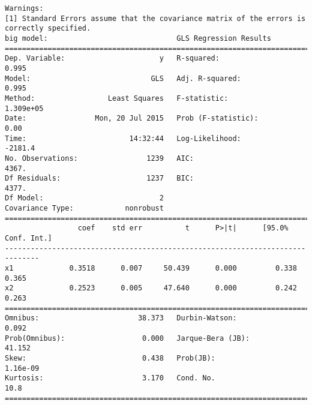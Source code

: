 \documentclass{article}
\begin{document}
\begin{verbatim}
Warnings:
[1] Standard Errors assume that the covariance matrix of the errors is correctly specified.
big model:                              GLS Regression Results                            
==============================================================================
Dep. Variable:                      y   R-squared:                       0.995
Model:                            GLS   Adj. R-squared:                  0.995
Method:                 Least Squares   F-statistic:                 1.309e+05
Date:                Mon, 20 Jul 2015   Prob (F-statistic):               0.00
Time:                        14:32:44   Log-Likelihood:                -2181.4
No. Observations:                1239   AIC:                             4367.
Df Residuals:                    1237   BIC:                             4377.
Df Model:                           2                                         
Covariance Type:            nonrobust                                         
==============================================================================
                 coef    std err          t      P>|t|      [95.0% Conf. Int.]
------------------------------------------------------------------------------
x1             0.3518      0.007     50.439      0.000         0.338     0.365
x2             0.2523      0.005     47.640      0.000         0.242     0.263
==============================================================================
Omnibus:                       38.373   Durbin-Watson:                   0.092
Prob(Omnibus):                  0.000   Jarque-Bera (JB):               41.152
Skew:                           0.438   Prob(JB):                     1.16e-09
Kurtosis:                       3.170   Cond. No.                         10.8
==============================================================================


\end{verbatim}
\end{document}
